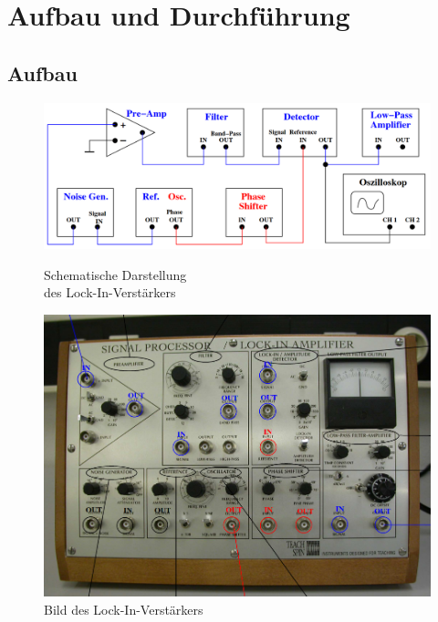 \section{Aufbau und Durchführung}

\subsection{Aufbau}
\label{sec:Aufbau}

\begin{figure}
    \begin{minipage}[b]{.4\linewidth} %
       \includegraphics[width=\linewidth]{img/Schema.png}
       \caption{Schematische Darstellung\\ des Lock-In-Verstärkers}
       \label{fig:SchematischeDarstellungLockIn}
    \end{minipage}
    \hspace{.1\linewidth}%
    \begin{minipage}[b]{.4\linewidth} %
       \includegraphics[width=\linewidth]{img/BildLockIn.png}
       \caption{Bild des Lock-In-Verstärkers}
       \label{fig:BildLockIn}
    \end{minipage}
 \end{figure}

